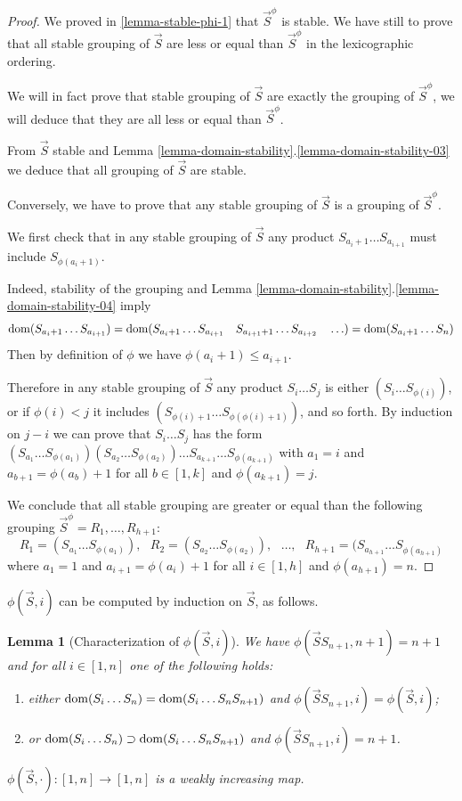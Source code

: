 \documentclass{lmcs}
\newtheorem{lemma}[theorem]{Lemma}
\begin{document}
\begin{proof}
We proved in \ref{lemma-stable-phi-1} that $\vec{S}^\phi$ is stable. We have still to
prove that all stable grouping of $\vec{S}$ 
are less or equal than $\vec{S}^\phi$ in the lexicographic ordering.

We will in fact prove that stable grouping of $\vec{S}$ are exactly the grouping of 
$\vec{S}^\phi$, we will deduce that they are all less or equal than $\vec{S}^\phi$.

From $\vec{S}$ stable and 
Lemma \ref{lemma-domain-stability}.\ref{lemma-domain-stability-03} 
we deduce that all grouping of $\vec{S}$ are stable.

Conversely, we have to prove that any stable grouping of $\vec{S}$  is a grouping
of $\vec{S}^\phi$.

We first check that in any stable grouping of $\vec{S}$ any 
product $S_{a_i+1} \ldots S_{a_{i+1}}$  must include $S_{\phi(a_i+1)}$.

Indeed, stability of the grouping and 
Lemma \ref{lemma-domain-stability}.\ref{lemma-domain-stability-04} 
imply
$$
{\rm dom}(S_{a_i+1} \ldots S_{a_{i+1}}) = 
{\rm dom}(S_{a_i+1} \ldots S_{a_{i+1}} \ \ \ S_{a_{i+1}+1} \ldots S_{a_{i+2}} \ \ \ \ldots) =
{\rm dom}(S_{a_i+1} \ldots S_n)
$$ 
Then by definition of $\phi$ we have $\phi(a_i+1) \le a_{i+1} $.

Therefore in any stable grouping of $\vec{S}$
any product $S_i \ldots S_j$ is either $(S_{i}\ldots 
S_{\phi(i)})$, or if $\phi(i) < j$ it includes $(S_{\phi(i)+1}\ldots S_{\phi(\phi(i)+1)})$,
and so forth. By induction on $j-i$ we can prove that $S_i \ldots S_j$ has the form
$(S_{a_1}\ldots S_{\phi(a_1)}) (S_{a_2}\ldots S_{\phi(a_2)})
\ldots S_{a_{k+1}}\ldots S_{\phi(a_{k+1})}$ with $a_1=i$ and $a_{b+1} = \phi(a_b)+1$ 
for all $b \in [1,k]$ and $\phi(a_{k+1}) = j$. 


We conclude that all stable grouping are greater or equal than the following grouping 
$\vec{S}^\phi =R_1, \ldots, R_{h+1}$: 
$$
R_1 = (S_{a_1}\ldots S_{\phi(a_1)}), \ \ \ 
R_2 = (S_{a_2}\ldots S_{\phi(a_2)}), \ \ \ 
\ldots, \ \ \ 
R_{h+1} = (S_{a_{h+1}}\ldots S_{\phi(a_{h+1})}
$$ 
where $a_1=1$ and $a_{i+1} = \phi(a_i)+1$ 
for all $i \in [1,h]$ and $\phi(a_{h+1}) = n$. 
\end{proof}

$\phi(\vec{S},i)$ can be computed by induction on $\vec{S}$, as follows. 

\begin{lemma}[Characterization of $\phi(\vec{S},i)$]
\label{lemma-phi-characterization}
We have $\phi(\vec{S} S_{n+1}, n+1) = n+1$ and for all $i \in [1,n]$
one of the following holds:
\begin{enumerate}
\item
either ${\rm dom}(S_i \ldots S_n) = {\rm dom}(S_i \ldots S_n S_{n+1})$
and $\phi(\vec{S}S_{n+1},i) = \phi(\vec{S},i)$;
\item
or ${\rm dom}(S_i \ldots S_n) \supset {\rm dom}(S_i \ldots S_n S_{n+1})$
and $\phi(\vec{S}S_{n+1},i) = n+1$.
\end{enumerate}
$\phi(\vec{S},\cdot):[1,n] \rightarrow [1,n]$ is a weakly increasing map.
\end{lemma}
\end{document}
